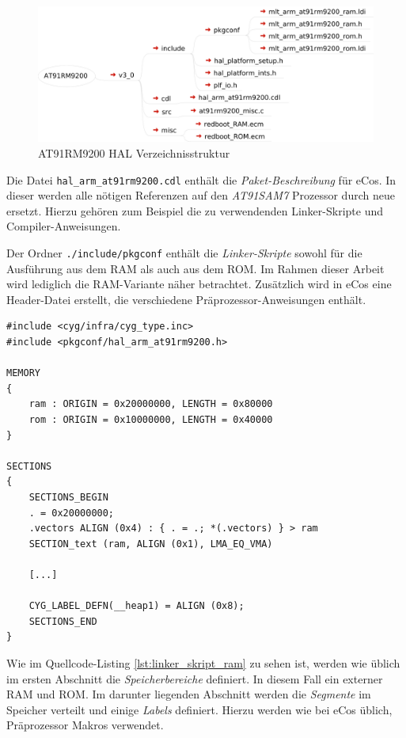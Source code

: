 \documentclass[
  a4paper,					%
  twoside,
  DIV=calc,     				%
  bibliography=totoc,
  cleardoublepage=empty,
  ngerman,     					%
  final       					%
]{scrbook}
\begin{document}
\begin{figure}
\includegraphics[width=12cm]{HAL_Dir_Map}
\caption{AT91RM9200 HAL Verzeichnisstruktur}
\label{fig:HAL_Dir_Map}
\end{figure}

Die Datei \texttt{hal\_arm\_at91rm9200.cdl} enthält die \emph{Paket-Beschreibung} für eCos. In dieser werden alle nötigen Referenzen auf den \emph{AT91SAM7} Prozessor durch neue ersetzt. Hierzu gehören zum Beispiel die zu verwendenden Linker-Skripte und Compiler-Anweisungen.

Der Ordner \texttt{./include/pkgconf} enthält die \emph{Linker-Skripte} sowohl für die Ausführung aus dem RAM als auch aus dem ROM. Im Rahmen dieser Arbeit wird lediglich die RAM-Variante näher betrachtet. Zusätzlich wird in eCos eine Header-Datei erstellt, die verschiedene Präprozessor-Anweisungen enthält.

\begin{lstlisting}[frame=single, float, caption={Linker-Skript RAM}, label={lst:linker_skript_ram}]
#include <cyg/infra/cyg_type.inc>
#include <pkgconf/hal_arm_at91rm9200.h>

MEMORY
{
    ram : ORIGIN = 0x20000000, LENGTH = 0x80000
    rom : ORIGIN = 0x10000000, LENGTH = 0x40000
}

SECTIONS
{
    SECTIONS_BEGIN
    . = 0x20000000;
    .vectors ALIGN (0x4) : { . = .; *(.vectors) } > ram
    SECTION_text (ram, ALIGN (0x1), LMA_EQ_VMA)

    [...]

    CYG_LABEL_DEFN(__heap1) = ALIGN (0x8);
    SECTIONS_END
}
\end{lstlisting}

Wie im Quellcode-Listing \ref{lst:linker_skript_ram} zu sehen ist, werden wie üblich im ersten Abschnitt die \emph{Speicherbereiche} definiert. In diesem Fall ein externer RAM und ROM. Im darunter liegenden Abschnitt werden die \emph{Segmente} im Speicher verteilt und einige \emph{Labels} definiert. Hierzu werden wie bei eCos üblich, Präprozessor Makros verwendet.
\end{document}
